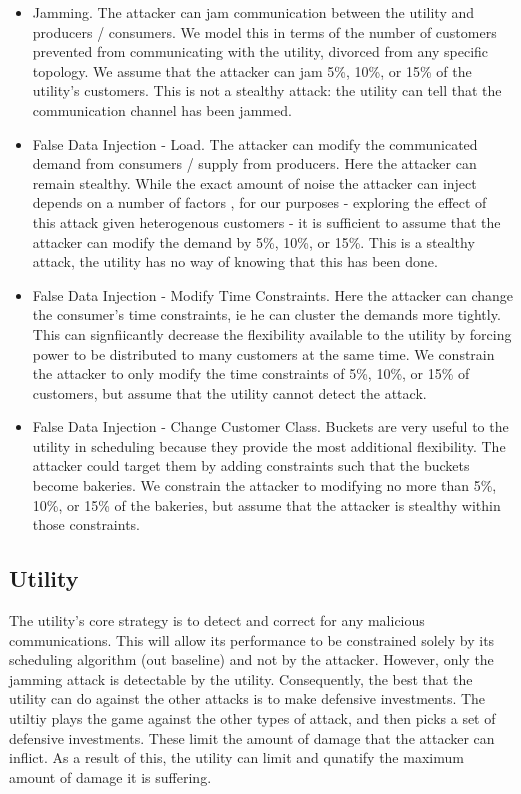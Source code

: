 \documentclass[conference]{IEEEtran}
\begin{document}
\begin{itemize}
\item Jamming. The attacker can jam communication between the utility and producers / consumers. We model this in terms of the number of customers prevented from communicating with the utility, divorced from any specific topology. We assume that the attacker can jam 5\%, 10\%, or 15\% of the utility's customers. This is not a stealthy attack: the utility can tell that the communication channel has been jammed.

\item False Data Injection - Load. The attacker can modify the communicated demand from consumers / supply from producers. Here the attacker can remain stealthy. While the exact amount of noise the attacker can inject depends on a number of factors \cite{yuan2011modeling}, for our purposes - exploring the effect of this attack given heterogenous customers - it is sufficient to assume that the attacker can modify the demand by 5\%, 10\%, or 15\%. This is a stealthy attack, the utility has no way of knowing that this has been done.

\item False Data Injection - Modify Time Constraints. Here the attacker can change the consumer's time constraints, ie he can cluster the demands more tightly. This can signfiicantly decrease the flexibility available to the utility by forcing power to be distributed to many customers at the same time. We constrain the attacker to only modify the time constraints of 5\%, 10\%, or 15\% of customers, but assume that the utility cannot detect the attack.

\item False Data Injection - Change Customer Class. Buckets are very useful to the utility in scheduling because they provide
the most additional flexibility. The attacker could target them by adding constraints such that the buckets become bakeries. We constrain the attacker to modifying no more than 5\%, 10\%, or 15\% of the bakeries, but assume that the attacker is stealthy within those constraints.

\end{itemize}

\subsection{Utility}
\label{Utility2}

The utility's core strategy is to detect and correct for any malicious communications. This will allow its performance to be
constrained solely by its scheduling algorithm (out baseline) and not by the attacker. However, only the jamming attack is detectable by the utility. Consequently, the best that the utility can do against the other attacks is to make defensive investments. The utiltiy plays the game against the other types of attack, and then picks a set of defensive investments. These limit the amount of damage that the attacker can inflict. As a result of this, the utility can limit and qunatify the maximum amount of damage it is suffering.
\end{document}
